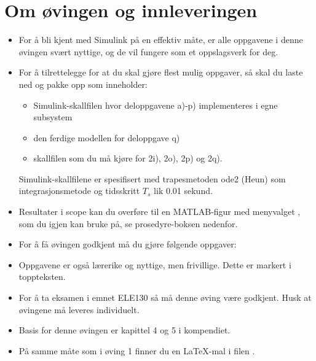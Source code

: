 \section*{Om øvingen og innleveringen}

\begin{boxedminipage}{\textwidth}
    \begin{itemize}
      \setlength\itemsep{0mm}
    \item For å bli kjent med Simulink på en effektiv måte,
      er alle oppgavene i denne øvingen svært nyttige, og de vil
      fungere som et oppslagsverk for deg.

  \item For å tilrettelegge for at du skal gjøre flest mulig oppgaver,
    så skal du laste ned og pakke opp  som inneholder:
    \begin{itemize}
    \item     Simulink-skallfilen
     hvor deloppgavene a)-p)
    implementeres i egne subsystem
    \item den ferdige modellen  for
      deloppgave q)  
  \item skallfilen    som
  du må kjøre for 2i),  2o), 2p) og 2q).    
\end{itemize}
    Simulink-skallfilene er spesifisert med trapesmetoden  {\sf ode2 (Heun)} som
    integrasjons\-metode og tidsskritt $T_{s}$ lik 0.01 sekund.

\item  Resultater i scope kan du overføre til en MATLAB-figur med menyvalget
  , som du igjen kan
     bruke  på, se prosedyre-boksen nedenfor.
      

    \item   {\color{red}  For å få øvingen godkjent må du gjøre følgende oppgaver:\\
      }

        \item   Oppgavene 
           er også lærerike og nyttige, men frivillige.
Dette er markert i toppteksten.       

  \item   {\color{red}  For å ta eksamen i emnet  ELE130 så må denne øving være
  godkjent. Husk at øvingene må leveres individuelt.}


  \item Basis for denne øvingen er
    {\color{blue} kapittel 4  og 5} i  kompendiet. 

    \item På samme måte som i øving 1 finner du en {\LaTeX}-mal i filen 
    .

  \end{itemize}
  \end{boxedminipage}

